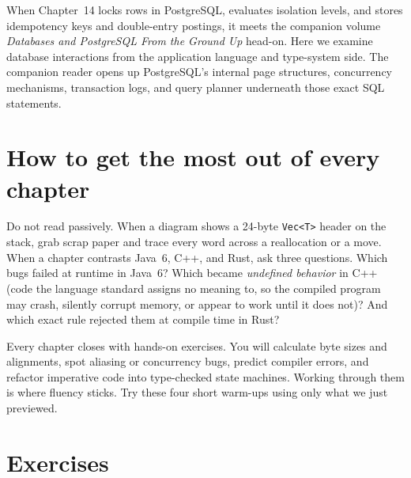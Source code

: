 \begin{center}
\end{center}

\begin{connectionbox}
When Chapter~14 locks rows in PostgreSQL, evaluates isolation levels, and stores idempotency keys and double-entry postings, it meets the companion volume \emph{Databases and PostgreSQL From the Ground Up} head-on. Here we examine database interactions from the application language and type-system side. The companion reader opens up PostgreSQL's internal page structures, concurrency mechanisms, transaction logs, and query planner underneath those exact SQL statements.
\end{connectionbox}

\section*{How to get the most out of every chapter}

Do not read passively. When a diagram shows a 24-byte \texttt{Vec<T>} header on the stack, grab scrap paper and trace every word across a reallocation or a move. When a chapter contrasts Java~6, C++, and Rust, ask three questions. Which bugs failed at runtime in Java~6? Which became \emph{undefined behavior} in C++ (code the language standard assigns no meaning to, so the compiled program may crash, silently corrupt memory, or appear to work until it does not)? And which exact rule rejected them at compile time in Rust?

Every chapter closes with hands-on exercises. You will calculate byte sizes and alignments, spot aliasing or concurrency bugs, predict compiler errors, and refactor imperative code into type-checked state machines. Working through them is where fluency sticks. Try these four short warm-ups using only what we just previewed.

\section*{Exercises}

